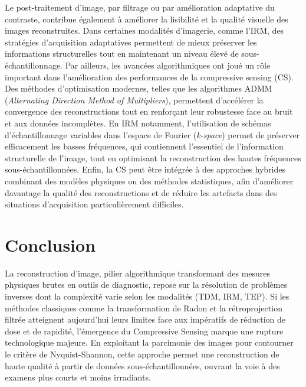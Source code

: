 Le post-traitement d'image, par filtrage ou par amélioration adaptative du contraste, contribue également à améliorer la lisibilité et la qualité visuelle des images reconstruites. Dans certaines modalités d'imagerie, comme l'IRM, des stratégies d'acquisition adaptatives permettent de mieux préserver les informations structurelles tout en maintenant un niveau élevé de sous-échantillonnage. Par ailleurs, les avancées algorithmiques ont joué un rôle important dans l'amélioration des performances de la compressive sensing (CS). Des méthodes d'optimisation modernes, telles que les algorithmes ADMM (\textit{Alternating Direction Method of Multipliers}), permettent d'accélérer la convergence des reconstructions tout en renforçant leur robustesse face au bruit et aux données incomplètes. En IRM notamment, l'utilisation de schémas d'échantillonnage variables dans l'espace de Fourier (\textit{k-space}) permet de préserver efficacement les basses fréquences, qui contiennent l'essentiel de l'information structurelle de l'image, tout en optimisant la reconstruction des hautes fréquences sous-échantillonnées. Enfin, la CS peut être intégrée à des approches hybrides combinant des modèles physiques ou des méthodes statistiques, afin d'améliorer davantage la qualité des reconstructions et de réduire les artefacts dans des situations d'acquisition particulièrement difficiles.

\section*{Conclusion}
La reconstruction d'image, pilier algorithmique transformant des mesures physiques brutes en outils de diagnostic, repose sur la résolution de problèmes inverses dont la complexité varie selon les modalités (TDM, IRM, TEP). Si les méthodes classiques comme la transformation de Radon et la rétroprojection filtrée atteignent aujourd'hui leurs limites face aux impératifs de réduction de dose et de rapidité, l'émergence du Compressive Sensing marque une rupture technologique majeure. En exploitant la parcimonie des images pour contourner le critère de Nyquist-Shannon, cette approche permet une reconstruction de haute qualité à partir de données sous-échantillonnées, ouvrant la voie à des examens plus courts et moins irradiants. 
